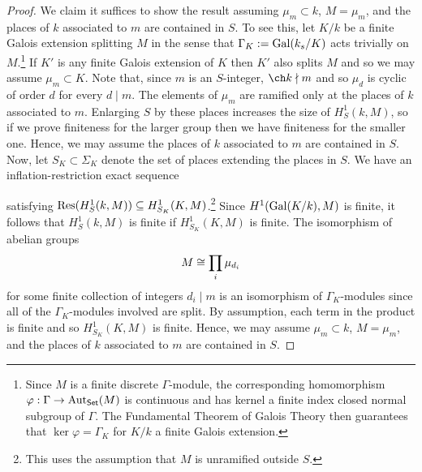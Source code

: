 \documentclass[11pt]{article}
\begin{document}
\begin{proof}
We claim it suffices to show the result assuming $\mu_m\subset k$, $M=\mu_m$, and the places of $k$ associated to $m$ are contained in $S$. To see this, let $K/k$ be a finite Galois extension splitting $M$ in the sense that $\Gamma_K:=\operatorname{Gal}(k_s/K)$ acts trivially on $M$.\footnote{Since $M$ is a finite discrete $\Gamma$-module, the corresponding homomorphism $\varphi: \Gamma\to\operatorname{Aut}_{\operatorname{\mathsf{Set}}}(M)$ is continuous and has kernel a finite index closed normal subgroup of $\Gamma$. The Fundamental Theorem of Galois Theory then guarantees that $\ker\varphi=\Gamma_K$ for $K/k$ a finite Galois extension.} If $K'$ is any finite Galois extension of $K$ then $K'$ also splits $M$ and so we may assume $\mu_m\subset K$. Note that, since $m$ is an $S$-integer, $\ch k\nmid m$ and so $\mu_d$ is cyclic of order $d$ for every $d\mid m$. The elements of $\mu_m$ are ramified only at the places of $k$ associated to $m$. Enlarging $S$ by these places increases the size of $H_S^1(k,M)$, so if we prove finiteness for the larger group then we have finiteness for the smaller one. Hence, we may assume the places of $k$ associated to $m$ are contained in $S$. Now, let $S_K\subset\Sigma_K$ denote the set of places extending the places in $S$. We have an inflation-restriction exact sequence
\begin{center}
\end{center}
satisfying $\operatorname{Res}(H_S^1(k,M))\subseteq H_{S_K}^1(K,M)$.\footnote{This uses the assumption that $M$ is unramified outside $S$.} Since $H^1(\operatorname{Gal}(K/k),M)$ is finite, it follows that $H_S^1(k,M)$ is finite if $H_{S_K}^1(K,M)$ is finite. The isomorphism of abelian groups
$$M\cong\prod_i\mu_{d_i}$$
for some finite collection of integers $d_i\mid m$ is an isomorphism of $\Gamma_K$-modules since all of the $\Gamma_K$-modules involved are split. By assumption, each term in the product is finite and so $H_{S_K}^1(K,M)$ is finite. Hence, we may assume $\mu_m\subset k$, $M=\mu_m$, and the places of $k$ associated to $m$ are contained in $S$. 


\end{proof}
\end{document}
